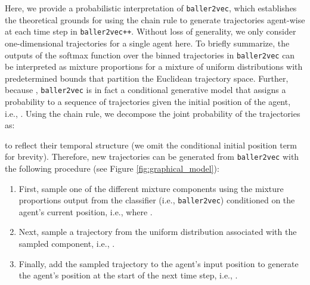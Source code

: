 \documentclass{article}
\newcommand{\btv}{\texttt{baller2vec}}
\newcommand{\btvpp}{\texttt{baller2vec++}}
\begin{document}
Here, we provide a probabilistic interpretation of \btv{}, which establishes the theoretical grounds for using the chain rule to generate trajectories agent-wise at each time step in \btvpp{}.
Without loss of generality, we only consider one-dimensional trajectories for a single agent here.
To briefly summarize, the outputs of the softmax function over the  binned trajectories in \btv{} can be interpreted as mixture proportions for a mixture of uniform distributions with predetermined bounds that partition the Euclidean trajectory space.
Further, because , \btv{} is in fact a conditional generative model that assigns a probability to a sequence of trajectories given the initial position of the agent, i.e., .
Using the chain rule, we decompose the joint probability of the trajectories as:



\noindent
to reflect their temporal structure (we omit the conditional initial position term for brevity).
Therefore, new trajectories can be generated from \btv{} with the following procedure (see Figure \ref{fig:graphical_model}):

\begin{enumerate}
    \item First, sample one of the  different mixture components using the mixture proportions output from the classifier  (i.e., \btv{}) conditioned on the agent's current position, i.e.,  where .
    \item Next, sample a trajectory from the uniform distribution associated with the sampled component, i.e., .
    \item Finally, add the sampled trajectory to the agent's input position to generate the agent's position at the start of the next time step, i.e., .
\end{enumerate}
\end{document}
